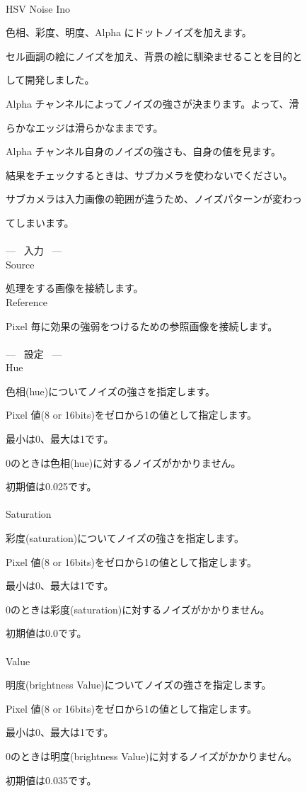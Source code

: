 \documentclass[a4paper,12pt]{article}
\begin{document}
\thispagestyle{empty}

\Large
\noindent \\
HSV Noise Ino\medskip
\par
\normalsize
色相、彩度、明度、Alpha にドットノイズを加えます。\par
セル画調の絵にノイズを加え、背景の絵に馴染ませることを目的と\par
して開発しました。\\
\par
Alpha チャンネルによってノイズの強さが決まります。よって、滑\par
らかなエッジは滑らかなままです。\par
Alpha チャンネル自身のノイズの強さも、自身の値を見ます。\\
\par
結果をチェックするときは、サブカメラを使わないでください。\par
サブカメラは入力画像の範囲が違うため、ノイズパターンが変わっ\par
てしまいます。\\
\\
--- \ 入力 \ ---\\
Source\par
処理をする画像を接続します。\\
Reference\par
Pixel 毎に効果の強弱をつけるための参照画像を接続します。\\
\\
--- \ 設定 \ ---\\
Hue\par
色相(hue)についてノイズの強さを指定します。\par
Pixel 値(8 or 16bits)をゼロから1の値として指定します。\par
最小は0、最大は1です。\par
0のときは色相(hue)に対するノイズがかかりません。\par
初期値は0.025です。\\
\\
Saturation\par
彩度(saturation)についてノイズの強さを指定します。\par
Pixel 値(8 or 16bits)をゼロから1の値として指定します。\par
最小は0、最大は1です。\par
0のときは彩度(saturation)に対するノイズがかかりません。\par
初期値は0.0です。\\
\\
Value\par
明度(brightness Value)についてノイズの強さを指定します。\par
Pixel 値(8 or 16bits)をゼロから1の値として指定します。\par
最小は0、最大は1です。\par
0のときは明度(brightness Value)に対するノイズがかかりません。\par
初期値は0.035です。
\end{document}
